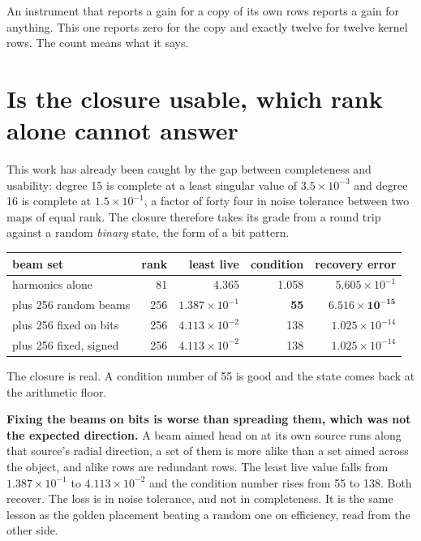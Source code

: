 An instrument that reports a gain for a copy of its own rows reports a gain for anything. This one
reports zero for the copy and exactly twelve for twelve kernel rows. The count means what it says.

\section{Is the closure usable, which rank alone cannot answer}

This work has already been caught by the gap between completeness and usability: degree 15 is
complete at a least singular value of \(3.5 \times 10^{-3}\) and degree 16 is complete at
\(1.5 \times 10^{-1}\), a factor of forty four in noise tolerance between two maps of equal rank. The
closure therefore takes its grade from a round trip against a random \emph{binary} state, the form of a bit
pattern.

\begin{center}
\begin{tabular}{@{}lrrrr@{}}
\toprule
beam set & rank & least live & condition & recovery error \\
\midrule
harmonics alone & 81 & 4.365 & 1.058 & \(5.605 \times 10^{-1}\) \\
plus 256 random beams & 256 & \(1.387 \times 10^{-1}\) & \textbf{55} & \(\mathbf{6.516 \times 10^{-15}}\) \\
plus 256 fixed on bits & 256 & \(4.113 \times 10^{-2}\) & 138 & \(1.025 \times 10^{-14}\) \\
plus 256 fixed, signed & 256 & \(4.113 \times 10^{-2}\) & 138 & \(1.025 \times 10^{-14}\) \\
\bottomrule
\end{tabular}
\end{center}

The closure is real. A condition number of 55 is good and the state comes back at the arithmetic
floor.

\textbf{Fixing the beams on bits is worse than spreading them, which was not the expected direction.}
A beam aimed head on at its own source runs along that source's radial direction, a set of them is
more alike than a set aimed across the object, and alike rows are redundant rows. The least live value
falls from \(1.387 \times 10^{-1}\) to \(4.113 \times 10^{-2}\) and the condition number rises from 55
to 138. Both recover. The loss is in noise tolerance, and not in completeness. It is the same
lesson as the golden placement beating a random one on efficiency, read from the other side.

